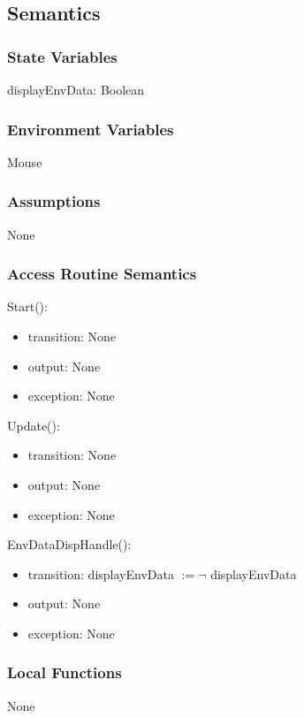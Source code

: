 \documentclass[12pt, titlepage]{article}
\begin{document}
\subsection{Semantics}

\subsubsection{State Variables}
displayEnvData: Boolean

\subsubsection{Environment Variables}
Mouse
\subsubsection{Assumptions}
None
\subsubsection{Access Routine Semantics}

\noindent Start():
\begin{itemize}
\item transition: None
\item output: None
\item exception: None
\end{itemize}


\noindent Update():
\begin{itemize}
\item transition: None
\item output: None
\item exception: None
\end{itemize}

\noindent EnvDataDispHandle():
\begin{itemize}
\item transition: displayEnvData $\mathit {:= \neg}$ displayEnvData
\item output: None
\item exception: None
\end{itemize}

\subsubsection{Local Functions}
None

\newpage

\end{document}
